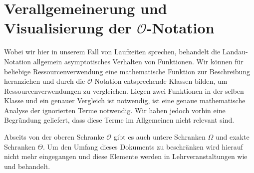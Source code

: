 \section{Verallgemeinerung und Visualisierung der $\mathcal{O}$-Notation}
%
Wobei wir hier in unserem Fall von Laufzeiten sprechen, behandelt die Landau-Notation allgemein asymptotisches Verhalten von Funktionen. Wir können für beliebige Ressourcenverwendung eine mathematische Funktion zur Beschreibung heranziehen und durch die $\mathcal{O}$-Notation entsprechende Klassen bilden, um Ressourcenverwendungen zu vergleichen. Liegen zwei Funktionen in der selben Klasse und ein genauer Vergleich ist notwendig, ist eine genaue mathematische Analyse der ignorierten Terme notwendig. Wir haben jedoch vorhin eine Begründung geliefert, dass diese Terme im Allgemeinen nicht relevant sind.

Abseits von der oberen Schranke $\mathcal{O}$ gibt es auch untere Schranken $\Omega$ und exakte Schranken $\Theta$. Um den Umfang dieses Dokuments zu beschränken wird hierauf nicht mehr eingegangen und diese Elemente werden in Lehrveranstaltungen wie \coursedsa{} und \coursedaa{} behandelt.

